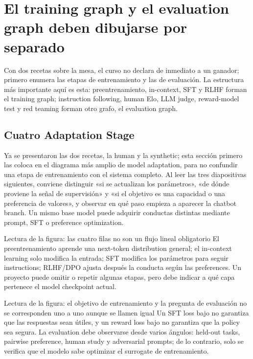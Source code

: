 \section{El training graph y el evaluation graph deben dibujarse por separado}

Con dos recetas sobre la mesa, el curso no declara de inmediato a un ganador; primero enumera las etapas de entrenamiento y las de evaluación. La estructura más importante aquí es esta: preentrenamiento, in-context, SFT y RLHF forman el training graph; instruction following, human Elo, LLM judge, reward-model test y red teaming forman otro grafo, el evaluation graph.

\subsection{Cuatro Adaptation Stage}

Ya se presentaron las dos recetas, la human y la synthetic; esta sección primero las coloca en el diagrama más amplio de model adaptation, para no confundir una etapa de entrenamiento con el sistema completo. Al leer las tres diapositivas siguientes, conviene distinguir «si se actualizan los parámetros», «de dónde proviene la señal de supervisión» y «si el objetivo es una capacidad o una preferencia de valores», y observar en qué paso empieza a aparecer la chatbot branch. Un mismo base model puede adquirir conductas distintas mediante prompt, SFT o preference optimization.


\begin{knowledgebox}{Lectura de la figura: las cuatro filas no son un flujo lineal obligatorio}
El preentrenamiento aprende una next-token distribution general; el in-context learning solo modifica la entrada; SFT modifica los parámetros para seguir instructions; RLHF/DPO ajusta después la conducta según las preferences. Un proyecto puede omitir o repetir algunas etapas, pero debe indicar a qué capa pertenece el model checkpoint actual.
\end{knowledgebox}


\begin{knowledgebox}{Lectura de la figura: el objetivo de entrenamiento y la pregunta de evaluación no se corresponden uno a uno aunque se llamen igual}
Un SFT loss bajo no garantiza que las respuestas sean útiles, y un reward loss bajo no garantiza que la policy sea segura. La evaluation debe observarse desde varios ángulos: held-out tasks, pairwise preference, human study y adversarial prompts; de lo contrario, solo se verifica que el modelo sabe optimizar el surrogate de entrenamiento.
\end{knowledgebox}

